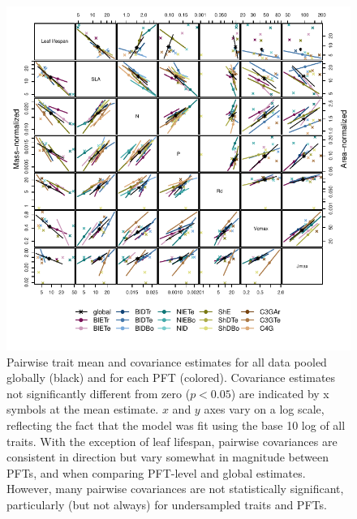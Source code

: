 \begin{figure}
  \centering
  \includegraphics[width=\textwidth]{1_mvtraits/figures/stick_pairs.pdf}
  \caption{%
    Pairwise trait mean and covariance estimates for all data pooled globally (black) and for each PFT (colored).
    Covariance estimates not significantly different from zero ($p < 0.05$) are indicated by x symbols at the mean estimate.
    $x$ and $y$ axes vary on a log scale, reflecting the fact that the model was fit using the base 10 log of all traits.
    With the exception of leaf lifespan, pairwise covariances are consistent in direction but vary somewhat in magnitude between PFTs, and when comparing PFT-level and global estimates.
    However, many pairwise covariances are not statistically significant, particularly (but not always) for undersampled traits and PFTs.
  }\label{fig:mvtraits-fig4}
\end{figure}

